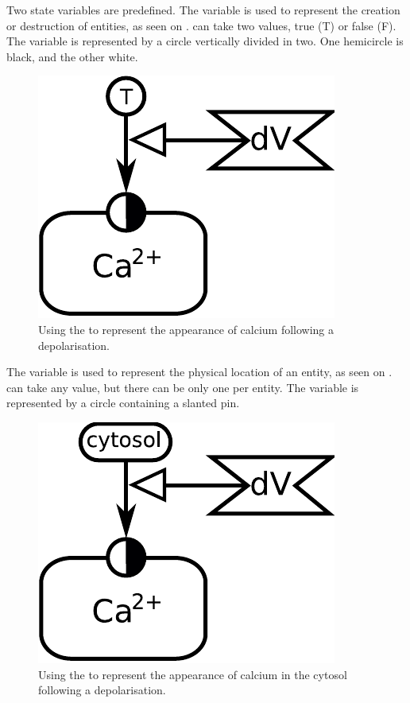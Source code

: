 Two state variables are predefined. The variable  is used to represent the creation or destruction of entities, as seen on \label{sec:existence}.  can take two values, true (T) or false (F). The variable is represented by a circle vertically divided in two. One hemicircle is black, and the other white. 

\begin{figure}[H]
  \centering
  \includegraphics[scale = 0.5]{examples/ex-existence}
  \caption{Using the   to represent the appearance of calcium following a depolarisation.}
  \label{fig:ex-existence}
\end{figure}

The variable  is used to represent the physical location of an entity, as seen on \label{sec:location}.  can take any value, but there can be only one  per entity. The variable is represented by a circle containing a slanted pin.

\begin{figure}[H]
  \centering
  \includegraphics[scale = 0.5]{examples/ex-location}
  \caption{Using the   to represent the appearance of calcium in the cytosol following a depolarisation.}
  \label{fig:ex-location}
\end{figure}

\normalcolor


